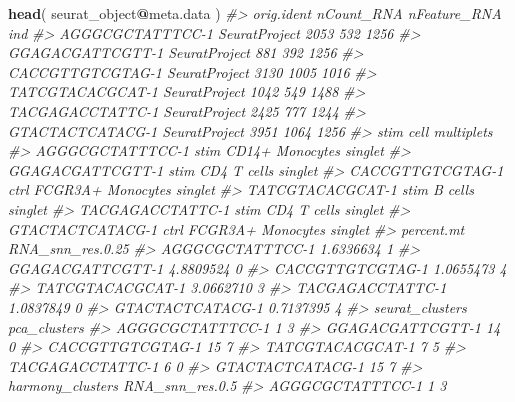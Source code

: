 \documentclass[
]{book}
\newenvironment{Shaded}{\begin{snugshade}}{\end{snugshade}}
\newcommand{\CommentTok}[1]{\textcolor[rgb]{0.56,0.35,0.01}{\textit{#1}}}
\newcommand{\FunctionTok}[1]{\textcolor[rgb]{0.13,0.29,0.53}{\textbf{#1}}}
\newcommand{\NormalTok}[1]{#1}
\newcommand{\SpecialCharTok}[1]{\textcolor[rgb]{0.81,0.36,0.00}{\textbf{#1}}}
\begin{document}
\begin{Shaded}
\begin{Highlighting}[]
\FunctionTok{head}\NormalTok{( seurat\_object}\SpecialCharTok{@}\NormalTok{meta.data )}
\CommentTok{\#\textgreater{}                     orig.ident nCount\_RNA nFeature\_RNA  ind}
\CommentTok{\#\textgreater{} AGGGCGCTATTTCC{-}1 SeuratProject       2053          532 1256}
\CommentTok{\#\textgreater{} GGAGACGATTCGTT{-}1 SeuratProject        881          392 1256}
\CommentTok{\#\textgreater{} CACCGTTGTCGTAG{-}1 SeuratProject       3130         1005 1016}
\CommentTok{\#\textgreater{} TATCGTACACGCAT{-}1 SeuratProject       1042          549 1488}
\CommentTok{\#\textgreater{} TACGAGACCTATTC{-}1 SeuratProject       2425          777 1244}
\CommentTok{\#\textgreater{} GTACTACTCATACG{-}1 SeuratProject       3951         1064 1256}
\CommentTok{\#\textgreater{}                  stim              cell multiplets}
\CommentTok{\#\textgreater{} AGGGCGCTATTTCC{-}1 stim   CD14+ Monocytes    singlet}
\CommentTok{\#\textgreater{} GGAGACGATTCGTT{-}1 stim       CD4 T cells    singlet}
\CommentTok{\#\textgreater{} CACCGTTGTCGTAG{-}1 ctrl FCGR3A+ Monocytes    singlet}
\CommentTok{\#\textgreater{} TATCGTACACGCAT{-}1 stim           B cells    singlet}
\CommentTok{\#\textgreater{} TACGAGACCTATTC{-}1 stim       CD4 T cells    singlet}
\CommentTok{\#\textgreater{} GTACTACTCATACG{-}1 ctrl FCGR3A+ Monocytes    singlet}
\CommentTok{\#\textgreater{}                  percent.mt RNA\_snn\_res.0.25}
\CommentTok{\#\textgreater{} AGGGCGCTATTTCC{-}1  1.6336634                1}
\CommentTok{\#\textgreater{} GGAGACGATTCGTT{-}1  4.8809524                0}
\CommentTok{\#\textgreater{} CACCGTTGTCGTAG{-}1  1.0655473                4}
\CommentTok{\#\textgreater{} TATCGTACACGCAT{-}1  3.0662710                3}
\CommentTok{\#\textgreater{} TACGAGACCTATTC{-}1  1.0837849                0}
\CommentTok{\#\textgreater{} GTACTACTCATACG{-}1  0.7137395                4}
\CommentTok{\#\textgreater{}                  seurat\_clusters pca\_clusters}
\CommentTok{\#\textgreater{} AGGGCGCTATTTCC{-}1               1            3}
\CommentTok{\#\textgreater{} GGAGACGATTCGTT{-}1              14            0}
\CommentTok{\#\textgreater{} CACCGTTGTCGTAG{-}1              15            7}
\CommentTok{\#\textgreater{} TATCGTACACGCAT{-}1               7            5}
\CommentTok{\#\textgreater{} TACGAGACCTATTC{-}1               6            0}
\CommentTok{\#\textgreater{} GTACTACTCATACG{-}1              15            7}
\CommentTok{\#\textgreater{}                  harmony\_clusters RNA\_snn\_res.0.5}
\CommentTok{\#\textgreater{} AGGGCGCTATTTCC{-}1                1               3}

\end{Highlighting}
\end{Shaded}
\end{document}
